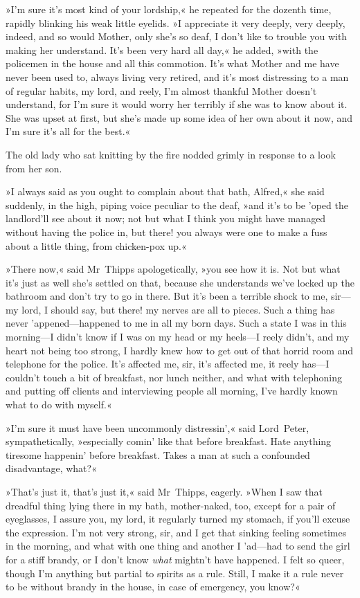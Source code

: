 »I'm sure it's most kind of your lordship,« he repeated for the dozenth time, rapidly blinking his weak little eyelids. »I appreciate it very deeply, very deeply, indeed, and so would Mother, only she's so deaf, I don't like to trouble you with making her understand. It's been very hard all day,« he added, »with the policemen in the house and all this commotion. It's what Mother and me have never been used to, always living very retired, and it's most distressing to a man of regular habits, my lord, and reely, I'm almost thankful Mother doesn't understand, for I'm sure it would worry her terribly if she was to know about it. She was upset at first, but she's made up some idea of her own about it now, and I'm sure it's all for the best.«

The old lady who sat knitting by the fire nodded grimly in response to a look from her son.

»I always said as you ought to complain about that bath, Alfred,« she said suddenly, in the high, piping voice peculiar to the deaf, »and it's to be 'oped the landlord'll see about it now; not but what I think you might have managed without having the police in, but there! you always were one to make a fuss about a little thing, from chicken-pox up.«

»There now,« said Mr~Thipps apologetically, »you see how it is. Not but what it's just as well she's settled on that, because she understands we've locked up the bathroom and don't try to go in there. But it's been a terrible shock to me, sir—my lord, I should say, but there! my nerves are all to pieces. Such a thing has never 'appened—happened to me in all my born days. Such a state I was in this morning—I didn't know if I was on my head or my heels—I reely didn't, and my heart not being too strong, I hardly knew how to get out of that horrid room and telephone for the police. It's affected me, sir, it's affected me, it reely has—I couldn't touch a bit of breakfast, nor lunch neither, and what with telephoning and putting off clients and interviewing people all morning, I've hardly known what to do with myself.«

»I'm sure it must have been uncommonly distressin',« said Lord~Peter, sympathetically, »especially comin' like that before breakfast. Hate anything tiresome happenin' before breakfast. Takes a man at such a confounded disadvantage, what?«

»That's just it, that's just it,« said Mr~Thipps, eagerly. »When I saw that dreadful thing lying there in my bath, mother-naked, too, except for a pair of eyeglasses, I assure you, my lord, it regularly turned my stomach, if you'll excuse the expression. I'm not very strong, sir, and I get that sinking feeling sometimes in the morning, and what with one thing and another I 'ad—had to send the girl for a stiff brandy, or I don't know \textit{what} mightn't have happened. I felt so queer, though I'm anything but partial to spirits as a rule. Still, I make it a rule never to be without brandy in the house, in case of emergency, you know?«

